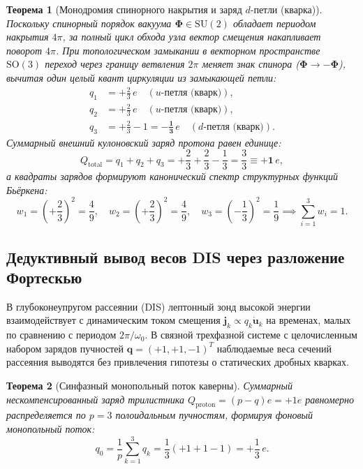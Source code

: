 \documentclass[11pt,a4paper]{article}
\newtheorem{theorem}{Теорема}
\theoremstyle{definition}
\theoremstyle{remark}
\begin{document}
\begin{theorem}[Монодромия спинорного накрытия и заряд $d$-петли (кварка)]
\label{thm:d_quark_charge_spinor_cut}
Поскольку спинорный порядок вакуума $\boldsymbol{\Phi} \in \mathrm{SU}(2)$ обладает периодом накрытия $4\pi$, за полный цикл обхода узла вектор смещения накапливает поворот $4\pi$. При топологическом замыкании в векторном пространстве $\mathrm{SO}(3)$ переход через границу ветвления $2\pi$ меняет знак спинора ($\boldsymbol{\Phi} \to -\boldsymbol{\Phi}$), вычитая один целый квант циркуляции из замыкающей петли:
\begin{align}
    q_1 &= +\frac{2}{3} \, e \quad (u\text{-петля (кварк)}), \label{eq:q_u1_exact} \\
    q_2 &= +\frac{2}{3} \, e \quad (u\text{-петля (кварк)}), \label{eq:q_u2_exact} \\
    q_3 &= +\frac{2}{3} - 1 = -\frac{\mathbf{1}}{\mathbf{3}} \, e \quad (d\text{-петля (кварк)}). \label{eq:q_d_exact}
\end{align}
Суммарный внешний кулоновский заряд протона равен единице:
\begin{equation}
    Q_{\mathrm{total}} = q_1 + q_2 + q_3 = +\frac{2}{3} + \frac{2}{3} - \frac{1}{3} = \frac{3}{3} \equiv +\mathbf{1} \, e,
\end{equation}
а квадраты зарядов формируют канонический спектр структурных функций Бьёркена:
\begin{equation}
    w_1 = \left(+\frac{2}{3}\right)^2 = \frac{4}{9}, \quad w_2 = \left(+\frac{2}{3}\right)^2 = \frac{4}{9}, \quad w_3 = \left(-\frac{1}{3}\right)^2 = \frac{1}{9} \implies \sum_{i=1}^3 w_i = 1.
\end{equation}
\end{theorem}

\subsection{Дедуктивный вывод весов DIS через разложение Фортескью}

В глубоконеупругом рассеянии (DIS) лептонный зонд высокой энергии взаимодействует с динамическим током смещения $\mathbf{j}_k \propto q_k \dot{\mathbf{u}}_k$ на временах, малых по сравнению с периодом $2\pi/\omega_0$. В связной трехфазной системе с целочисленным набором зарядов пучностей $\mathbf{q} = (+1, +1, -1)^T$ наблюдаемые веса сечений рассеяния выводятся без привлечения гипотезы о статических дробных кварках.

\begin{theorem}[Синфазный монопольный поток каверны]
\label{thm:fortescue_monopole_flux}
Суммарный нескомпенсированный заряд трилистника $Q_{\mathrm{proton}} = (p - q)e = +1e$ равномерно распределяется по $p = 3$ полоидальным пучностям, формируя фоновый монопольный поток:
\begin{equation}
q_0 = \frac{1}{p} \sum_{k=1}^3 q_k = \frac{1}{3} (+1 + 1 - 1) = +\frac{1}{3} \, e.
\label{eq:fortescue_monopole_flux}
\end{equation}
\end{theorem}
\end{document}
